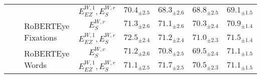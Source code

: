 \begin{table*}[ht]
{\begin{tabular}{lllc cccc}
 &  &  & $E_{EZ}^{W,1}, E_S^{W,r}$ & $70.4_{\pm2.5}$ & $68.3_{\pm2.6}$ & $68.8_{\pm2.5}$ & $69.1_{\pm1.5}$ \\ \cmidrule{3-8} 
 &  & \multirow{2}{*}{RoBERTEye Fixations} & $E_S^{W,r}$ & $71.3_{\pm2.6}$ & $71.1_{\pm2.6}$ & $70.3_{\pm2.4}$ & $70.9_{\pm1.4}$ \\ 
 &  &  & $E_{EZ}^{W,1}, E_S^{W,r}$ & $72.5_{\pm2.4}$ & $71.2_{\pm2.4}$ & $71.0_{\pm2.3}$ & $71.5_{\pm1.4}$ \\ \cmidrule{3-8} 
 &  & \multirow{2}{*}{RoBERTEye Words} & $E_S^{W,r}$ & $71.2_{\pm2.6}$ & $70.8_{\pm2.5}$ & $69.5_{\pm2.4}$ & $71.1_{\pm1.5}$ \\ 
 &  &  & $E_{EZ}^{W,1}, E_S^{W,r}$ & $71.1_{\pm2.5}$ & $71.7_{\pm2.5}$ & $70.5_{\pm2.3}$ & $71.1_{\pm1.5}$ \\ \midrule


\end{tabular}}
\end{table*}
